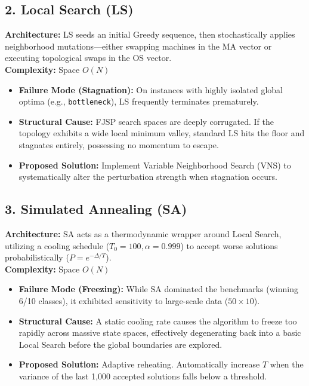 \documentclass[11pt,a4paper]{article}
\begin{document}
\subsection{2. Local Search (LS)}
\textbf{Architecture:} LS seeds an initial Greedy sequence, then stochastically applies neighborhood mutations—either swapping machines in the MA vector or executing topological swaps in the OS vector. \\
\textbf{Complexity:} Space $O(N)$
\begin{itemize}
    \item \textbf{Failure Mode (Stagnation):} On instances with highly isolated global optima (e.g., \texttt{bottleneck}), LS frequently terminates prematurely.
    \item \textbf{Structural Cause:} FJSP search spaces are deeply corrugated. If the topology exhibits a wide local minimum valley, standard LS hits the floor and stagnates entirely, possessing no momentum to escape.
    \item \textbf{Proposed Solution:} Implement Variable Neighborhood Search (VNS) to systematically alter the perturbation strength when stagnation occurs.
\end{itemize}

\subsection{3. Simulated Annealing (SA)}
\textbf{Architecture:} SA acts as a thermodynamic wrapper around Local Search, utilizing a cooling schedule ($T_0=100, \alpha=0.999$) to accept worse solutions probabilistically ($P = e^{-\Delta / T}$). \\
\textbf{Complexity:} Space $O(N)$
\begin{itemize}
    \item \textbf{Failure Mode (Freezing):} While SA dominated the benchmarks (winning 6/10 classes), it exhibited sensitivity to large-scale data ($50 \times 10$).
    \item \textbf{Structural Cause:} A static cooling rate causes the algorithm to freeze too rapidly across massive state spaces, effectively degenerating back into a basic Local Search before the global boundaries are explored.
    \item \textbf{Proposed Solution:} Adaptive reheating. Automatically increase $T$ when the variance of the last 1,000 accepted solutions falls below a threshold.
\end{itemize}
\end{document}
